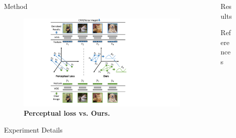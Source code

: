 \documentclass[final]{beamer}
\newlength{\sepwidth}
\newlength{\colwidth}
\newcommand{\separatorcolumn}{\begin{column}{\sepwidth}\end{column}}
\begin{document}
\begin{frame}[t]
\begin{columns}[t]
\separatorcolumn

\begin{column}{\colwidth}

  \begin{block}{Method}
  \begin{figure}
      \centering
      \includegraphics[width=.8\linewidth]{contents/teaser-2.pdf}
      \caption{\textbf{Perceptual loss vs. Ours.}}
  \end{figure}

  \end{block}

  \begin{block}{Experiment Details}


  \end{block}

\end{column}

\separatorcolumn

\begin{column}{\colwidth}

  \begin{exampleblock}{Results}

    
    
    
    

  \end{exampleblock}

  \begin{block}{References}

    \nocite{*}
    \footnotesize{}

  \end{block}

\end{column}

\separatorcolumn
\end{columns}
\end{frame}
\end{document}
